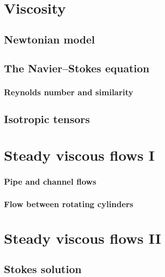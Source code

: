 \documentclass{tufte-book} %
\begin{document}
\chapter{Viscosity}
\label{ch:viscosity}
\section{Newtonian model}
\section{The Navier--Stokes equation}
\subsection{Reynolds number and similarity}
\begin{subappendices}
\section{Isotropic tensors}
\end{subappendices}
\chapter{Steady viscous flows I}
\subsection{Pipe and channel flows}
\subsection{Flow between rotating cylinders}
\chapter{Steady viscous flows II}
\section{Stokes solution}
\end{document}
